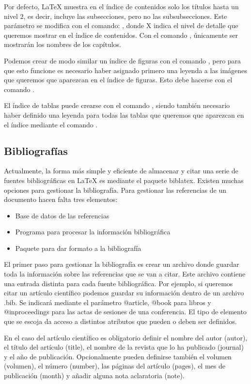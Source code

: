 \documentclass[11pt, a4paper]{article}
\begin{document}
Por defecto, LaTeX muestra en el índice de contenidos solo los títulos hasta un nivel 2, es decir, incluye las subsecciones, pero no las subsubsecciones. Este parámetro se modifica con el comando: , donde X indica el nivel de detalle que queremos mostrar en el índice de contenidos. Con el comando , únicamente ser mostrarán los nombres de los capítulos.

Podemos crear de modo similar un índice de figuras con el comando , pero para que esto funcione es necesario haber asignado primero una leyenda a las imágenes que queremos que aparezcan en el índice de figuras. Esto debe hacerse con el comando .

El índice de tablas puede crearse con el comando , siendo también necesario haber definido una leyenda para todas las tablas que queremos que aparezcan en el índice mediante el comando .

\subsection{Bibliografías}

Actualmente, la forma más simple y eficiente de almacenar y citar una serie de fuentes bibliográficas en LaTeX es mediante el paquete biblatex. Existen muchas opciones para gestionar la bibliografía. Para gestionar las referencias de un documento hacen falta tres elementos:
\begin{itemize}
\item Base de datos de las referencias
\item Programa para procesar la información bibliográfica
\item Paquete para dar formato a la bibliografía
\end{itemize}

El primer paso para gestionar la bibliografía es crear un archivo donde guardar toda la información sobre las referencias que se van a citar. Este archivo contiene una entrada distinta para cada fuente bibliográfica. Por ejemplo, si queremos citar un artículo científico podemos guardar su información dentro de un archivo .bib. Se indicará mediante el parámetro @article, @book para libros y @inproceedings para las actas de sesiones de una conferencia. El tipo de elemento que se escoja da acceso a distintos atributos que pueden o deben ser definidos.

En el caso del artículo científico es obligatorio definir el nombre del autor (autor), el título del artículo (title), el nombre de la revista que lo ha publicado (journal) y el año de publicación. Opcionalmente pueden definirse también el volumen (volumen), el número (number), las páginas del artículo (pages), el mes de publicación (month) y añadir alguna nota aclaratoria (note).
\end{document}
